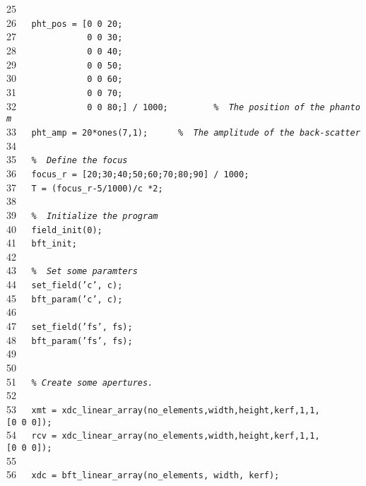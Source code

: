 \documentclass{manual}
\begin{document}
{25{\tt~~~}{\tt }\\
26{\tt~~~}{\tt pht\_pos~=~[0~0~20;}\\
27{\tt~~~}{\tt ~~~~~~~~~~~0~0~30;}\\
28{\tt~~~}{\tt ~~~~~~~~~~~0~0~40;}\\
29{\tt~~~}{\tt ~~~~~~~~~~~0~0~50;}\\
30{\tt~~~}{\tt ~~~~~~~~~~~0~0~60;}\\
31{\tt~~~}{\tt ~~~~~~~~~~~0~0~70;}\\
32{\tt~~~}{\tt ~~~~~~~~~~~0~0~80;]~/~1000;~~~~~~~~~{\sl \%~~The~position~of~the~phantom}}\\
33{\tt~~~}{\tt pht\_amp~=~20*ones(7,1);~~~~~~{\sl \%~~The~amplitude~of~the~back-scatter}}\\
34{\tt~~~}{\tt }\\
35{\tt~~~}{\tt {\sl \%~~Define~the~focus~}}\\
36{\tt~~~}{\tt focus\_r~=~[20;30;40;50;60;70;80;90]~/~1000;}\\
37{\tt~~~}{\tt T~=~(focus\_r-5/1000)/c~*2;}\\
38{\tt~~~}{\tt }\\
39{\tt~~~}{\tt {\sl \%~~Initialize~the~program}}\\
40{\tt~~~}{\tt field\_init(0);}\\
41{\tt~~~}{\tt bft\_init;}\\
42{\tt~~~}{\tt }\\
43{\tt~~~}{\tt {\sl \%~~Set~some~paramters}}\\
44{\tt~~~}{\tt set\_field('c',~c);}\\
45{\tt~~~}{\tt bft\_param('c',~c);}\\
46{\tt~~~}{\tt }\\
47{\tt~~~}{\tt set\_field('fs',~fs);}\\
48{\tt~~~}{\tt bft\_param('fs',~fs);}\\
49{\tt~~~}{\tt }\\
50{\tt~~~}{\tt }\\
51{\tt~~~}{\tt {\sl \%~Create~some~apertures.}}\\
52{\tt~~~}{\tt }\\
53{\tt~~~}{\tt xmt~=~xdc\_linear\_array(no\_elements,width,height,kerf,1,1,[0~0~0]);}\\
54{\tt~~~}{\tt rcv~=~xdc\_linear\_array(no\_elements,width,height,kerf,1,1,[0~0~0]);}\\
55{\tt~~~}{\tt }\\
56{\tt~~~}{\tt xdc~=~bft\_linear\_array(no\_elements,~width,~kerf);}\\
}
\end{document}
